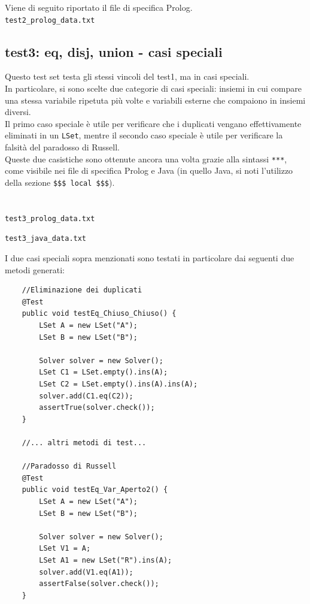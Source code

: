 Viene di seguito riportato il file di specifica Prolog.\\

\texttt{test2\_prolog\_data.txt}


%

\subsection{test3: eq, disj, union - casi speciali}
Questo test set testa gli stessi vincoli del test1, ma in casi speciali.\\
In particolare, si sono scelte due categorie di casi speciali: insiemi in cui compare una stessa variabile ripetuta più volte e variabili esterne che compaiono in insiemi diversi.\\
Il primo caso speciale è utile per verificare che i duplicati vengano effettivamente eliminati in un \texttt{LSet}, mentre il secondo caso speciale è utile per verificare la falsità del paradosso di Russell.\\
Queste due casistiche sono ottenute ancora una volta grazie alla sintassi \texttt{***}, come visibile nei file di specifica Prolog e Java (in quello Java, si noti l'utilizzo della sezione \texttt{\$\$\$ local \$\$\$}).\\\\\\

\texttt{test3\_prolog\_data.txt}


\vspace{10 mm}

\texttt{test3\_java\_data.txt}


\vspace{10 mm}

I due casi speciali sopra menzionati sono testati in particolare dai seguenti due metodi generati:\\

\begin{lstlisting}
	//Eliminazione dei duplicati
	@Test
	public void testEq_Chiuso_Chiuso() {
		LSet A = new LSet("A");
		LSet B = new LSet("B");
		
		Solver solver = new Solver();
		LSet C1 = LSet.empty().ins(A);
		LSet C2 = LSet.empty().ins(A).ins(A);
		solver.add(C1.eq(C2));
		assertTrue(solver.check());
	}
	
	//... altri metodi di test...
	
	//Paradosso di Russell
	@Test
	public void testEq_Var_Aperto2() {
		LSet A = new LSet("A");
		LSet B = new LSet("B");
		
		Solver solver = new Solver();
		LSet V1 = A;
		LSet A1 = new LSet("R").ins(A);
		solver.add(V1.eq(A1));
		assertFalse(solver.check());
	}
\end{lstlisting}

